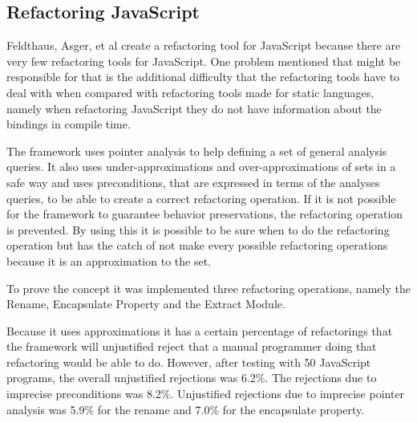 \subsection{Refactoring JavaScript}

Feldthaus, Asger, et al \cite{feldthaus2011tool} create a refactoring tool for JavaScript because there are very few refactoring tools for JavaScript. One problem mentioned that might be responsible for that is the additional difficulty that the refactoring tools have to deal with when compared with refactoring tools made for static languages, namely when refactoring JavaScript they do not have information about the bindings in compile time.



The framework uses pointer analysis to help defining a set of general analysis queries. It also uses under-approximations and over-approximations of sets in a safe way and uses preconditions, that are expressed in terms of the analyses queries, to be able to create a correct refactoring operation. 
If it is not possible for the framework to guarantee behavior preservations, the refactoring operation is prevented.
By using this it is possible to be sure when to do the refactoring operation but has the catch of not make every possible refactoring operations because it is an approximation to the set.

To prove the concept it was implemented three refactoring operations, namely the Rename, Encapsulate Property and the Extract Module.


Because it uses approximations it has a certain percentage of refactorings that the framework will unjustified reject that a manual programmer doing that refactoring would be able to do. 
However, after testing with 50 JavaScript programs, the overall unjustified rejections was 6.2\%. 
The rejections due to imprecise preconditions was 8.2\%.
Unjustified rejections due to imprecise pointer analysis was 5.9\% for the rename and 7.0\% for the encapsulate property. 
